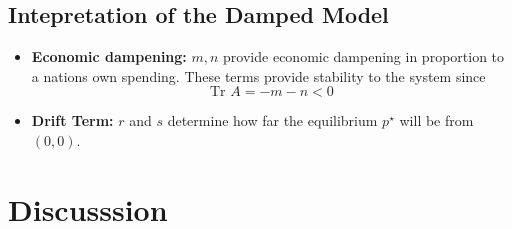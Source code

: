 \documentclass[12pt]{article}
\begin{document}
  \subsection{Intepretation of the Damped Model}
  \begin{itemize}
    \item \textbf{Economic dampening:} $m,n$ provide economic dampening in proportion to a nations own spending. These terms provide stability to the system since 
      \begin{equation}\label{eq:tr}\text{Tr }A = -m-n <0\end{equation}
    \item \textbf{Drift Term:} $r$ and $s$ determine how far the equilibrium $p^\star$ will be from $(0,0)$.
  \end{itemize}

\section{Discusssion}





\appendix
\end{document}
